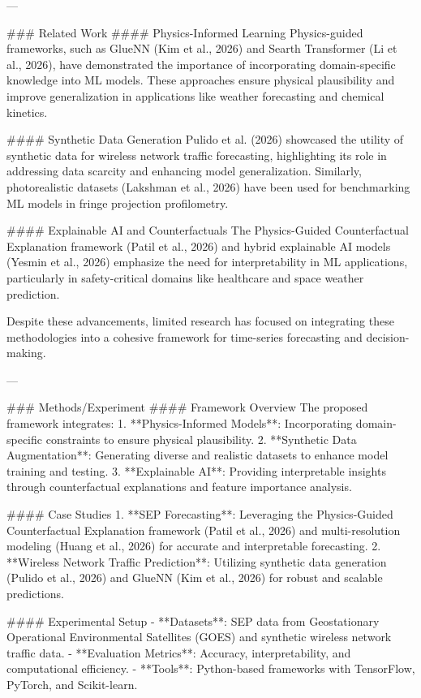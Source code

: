 ---

### Related Work  
#### Physics-Informed Learning  
Physics-guided frameworks, such as GlueNN (Kim et al., 2026) and Searth Transformer (Li et al., 2026), have demonstrated the importance of incorporating domain-specific knowledge into ML models. These approaches ensure physical plausibility and improve generalization in applications like weather forecasting and chemical kinetics.

#### Synthetic Data Generation  
Pulido et al. (2026) showcased the utility of synthetic data for wireless network traffic forecasting, highlighting its role in addressing data scarcity and enhancing model generalization. Similarly, photorealistic datasets (Lakshman et al., 2026) have been used for benchmarking ML models in fringe projection profilometry.

#### Explainable AI and Counterfactuals  
The Physics-Guided Counterfactual Explanation framework (Patil et al., 2026) and hybrid explainable AI models (Yesmin et al., 2026) emphasize the need for interpretability in ML applications, particularly in safety-critical domains like healthcare and space weather prediction.

Despite these advancements, limited research has focused on integrating these methodologies into a cohesive framework for time-series forecasting and decision-making.

---

### Methods/Experiment  
#### Framework Overview  
The proposed framework integrates:  
1. **Physics-Informed Models**: Incorporating domain-specific constraints to ensure physical plausibility.  
2. **Synthetic Data Augmentation**: Generating diverse and realistic datasets to enhance model training and testing.  
3. **Explainable AI**: Providing interpretable insights through counterfactual explanations and feature importance analysis.

#### Case Studies  
1. **SEP Forecasting**: Leveraging the Physics-Guided Counterfactual Explanation framework (Patil et al., 2026) and multi-resolution modeling (Huang et al., 2026) for accurate and interpretable forecasting.  
2. **Wireless Network Traffic Prediction**: Utilizing synthetic data generation (Pulido et al., 2026) and GlueNN (Kim et al., 2026) for robust and scalable predictions.

#### Experimental Setup  
- **Datasets**: SEP data from Geostationary Operational Environmental Satellites (GOES) and synthetic wireless network traffic data.  
- **Evaluation Metrics**: Accuracy, interpretability, and computational efficiency.  
- **Tools**: Python-based frameworks with TensorFlow, PyTorch, and Scikit-learn.

